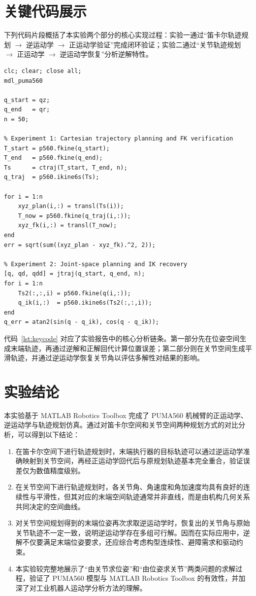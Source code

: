 \documentclass[UTF8,a4paper,12pt]{ctexart}
\begin{document}
\section{关键代码展示}

下列代码片段概括了本实验两个部分的核心实现过程：实验一通过“笛卡尔轨迹规划 $\rightarrow$ 逆运动学 $\rightarrow$ 正运动学验证”完成闭环验证；实验二通过“关节轨迹规划 $\rightarrow$ 正运动学 $\rightarrow$ 逆运动学恢复”分析逆解特性。

\begin{lstlisting}[style=matlabstyle,caption={实验关键 MATLAB 代码片段},label={lst:keycode}]
clc; clear; close all;
mdl_puma560

q_start = qz;
q_end   = qr;
n = 50;

% Experiment 1: Cartesian trajectory planning and FK verification
T_start = p560.fkine(q_start);
T_end   = p560.fkine(q_end);
Ts      = ctraj(T_start, T_end, n);
q_traj  = p560.ikine6s(Ts);

for i = 1:n
    xyz_plan(i,:) = transl(Ts(i));
    T_now = p560.fkine(q_traj(i,:));
    xyz_fk(i,:) = transl(T_now);
end
err = sqrt(sum((xyz_plan - xyz_fk).^2, 2));

% Experiment 2: Joint-space planning and IK recovery
[q, qd, qdd] = jtraj(q_start, q_end, n);
for i = 1:n
    Ts2(:,:,i) = p560.fkine(q(i,:));
    q_ik(i,:)  = p560.ikine6s(Ts2(:,:,i));
end
q_err = atan2(sin(q - q_ik), cos(q - q_ik));
\end{lstlisting}

代码~\ref{lst:keycode} 对应了实验报告中的核心分析链条。第一部分先在位姿空间生成末端轨迹，再通过逆解和正解回代计算位置误差；第二部分则在关节空间生成平滑轨迹，并通过逆运动学恢复关节角以评估多解性对结果的影响。

\section{实验结论}

本实验基于 MATLAB Robotics Toolbox 完成了 PUMA560 机械臂的正运动学、逆运动学与轨迹规划仿真。通过对笛卡尔空间和关节空间两种规划方式的对比分析，可以得到以下结论：
\begin{enumerate}
  \item 在笛卡尔空间下进行轨迹规划时，末端执行器的目标轨迹可以通过逆运动学准确映射到关节空间，再经正运动学回代后与原规划轨迹基本完全重合，验证误差仅为数值精度级别。
  \item 在关节空间下进行轨迹规划时，各关节角、角速度和角加速度均具有良好的连续性与平滑性，但其对应的末端空间轨迹通常并非直线，而是由机构几何关系共同决定的空间曲线。
  \item 对关节空间规划得到的末端位姿再次求取逆运动学时，恢复出的关节角与原始关节轨迹不一定一致，说明逆运动学存在多组可行解。因而在实际应用中，逆解不仅要满足末端位姿要求，还应综合考虑构型连续性、避障需求和驱动约束。
  \item 本实验较完整地展示了“由关节求位姿”和“由位姿求关节”两类问题的求解过程，验证了 PUMA560 模型与 MATLAB Robotics Toolbox 的有效性，并加深了对工业机器人运动学分析方法的理解。
\end{enumerate}
\end{document}
